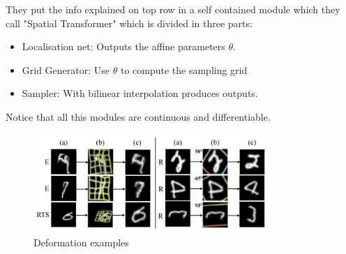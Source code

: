 They put the info explained on top row in a self contained module which they call "Spatial Transformer" which is divided in three parts:
\begin{itemize}
\item Localisation net: Outputs the affine parameters $\theta$.
\item Grid Generator: Use $\theta$ to compute the sampling grid
\item Sampler: With bilinear interpolation produces outputs.
\end{itemize}

Notice that all this modules are continuous and differentiable.

\begin{figure}[h]
  \centering
  \includegraphics[width=0.8\textwidth]{Images/spatial_transformer_networks/3.png}
  \caption{Deformation examples}
\end{figure}